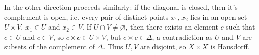 \documentclass[12pt,letterpaper]{article}
\let\emptyset\varnothing
\begin{document}
\begin{enumerate}
    \indent In the other direction proceeds similarly: if the diagonal is closed, then it's complement is open, i.e. every pair of distinct points $x_1,x_2$ lies in an open set $U\times V$. $x_1\in U$ and $x_2\in V$. If $U\cap V\neq \emptyset$, then there exists an element $c$ such that $c\in U$ and $c\in V$, so $c\times c\in U\times V$, but $c\times c\in \Delta$, a contradiction as $U$ and $V$ are subsets of the complement of $\Delta$. Thus $U,V$ are disjoint, so $X\times X$ is Hausdorff.
\end{enumerate}
\end{document}
